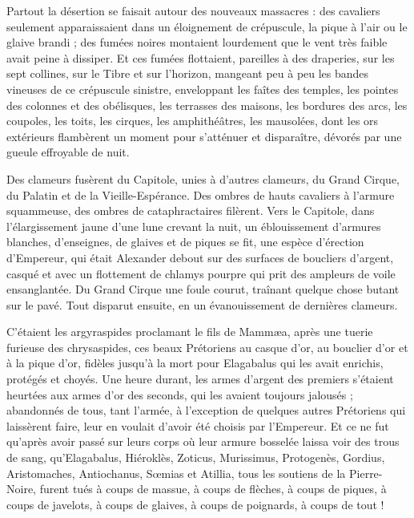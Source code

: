 \documentclass[a4paper, 11pt, oneside, polutonikogreek, french]{article}
\begin{document}
Partout la désertion se faisait autour des nouveaux massacres : des cavaliers seulement apparaissaient dans un éloignement de crépuscule, la pique à l'air ou le glaive brandi ; des fumées noires montaient lourdement que le vent très faible avait peine à dissiper. Et ces fumées flottaient, pareilles à des draperies, sur les sept collines, sur le Tibre et sur l'horizon, mangeant peu à peu les bandes vineuses de ce crépuscule sinistre, enveloppant les faîtes des temples, les pointes des colonnes et des obélisques, les terrasses des maisons, les bordures des arcs, les coupoles, les toits, les cirques, les amphithéâtres, les mausolées, dont les ors extérieurs flambèrent un moment pour s'atténuer et disparaître, dévorés par une gueule effroyable de nuit.

Des clameurs fusèrent du Capitole, unies à d'autres clameurs, du Grand Cirque, du Palatin et de la Vieille-Espérance. Des ombres de hauts cavaliers à l'armure squammeuse, des ombres de cataphractaires filèrent. Vers le Capitole, dans l'élargissement jaune d'une lune crevant la nuit, un éblouissement d'armures blanches, d'enseignes, de glaives et de piques se fit, une espèce d'érection d'Empereur, qui était Alexander debout sur des surfaces de boucliers d'argent, casqué et avec un flottement de chlamys pourpre qui prit des ampleurs de voile ensanglantée. Du Grand Cirque une foule courut, traînant quelque chose butant sur le pavé. Tout disparut ensuite, en un évanouissement de dernières clameurs.

C'étaient les argyraspides proclamant le fils de Mammæa, après une tuerie furieuse des chrysaspides, ces beaux Prétoriens au casque d'or, au bouclier d'or et à la pique d'or, fidèles jusqu'à la mort pour Elagabalus qui les avait enrichis, protégés et choyés. Une heure durant, les armes d'argent des premiers s'étaient heurtées aux armes d'or des seconds, qui les avaient toujours jalousés ; abandonnés de tous, tant l'armée, à l'exception de quelques autres Prétoriens qui laissèrent faire, leur en voulait d'avoir été choisis par l'Empereur. Et ce ne fut qu'après avoir passé sur leurs corps où leur armure bosselée laissa voir des trous de sang, qu'Elagabalus, Hiéroklès, Zoticus, Murissimus, Protogenès, Gordius, Aristomaches, Antiochanus, Sœmias et Atillia, tous les soutiens de la Pierre-Noire, furent tués à coups de massue, à coups de flèches, à coups de piques, à coups de javelots, à coups de glaives, à coups de poignards, à coups de tout !
\end{document}

